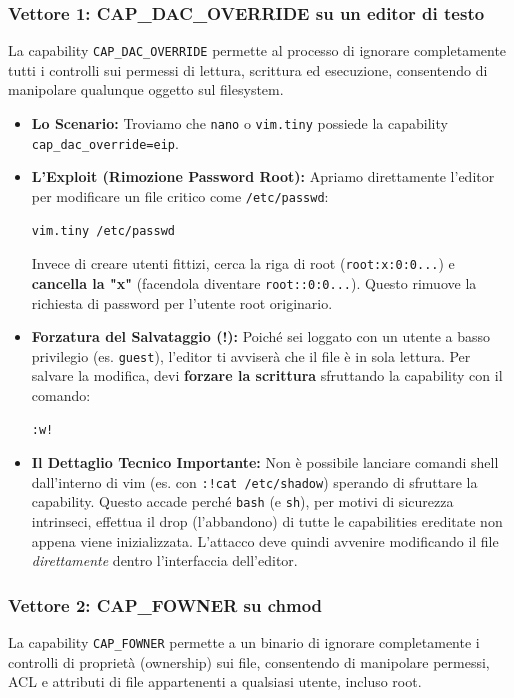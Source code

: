 \documentclass[12pt,a4paper]{report}
\begin{document}
	\subsubsection{Vettore 1: CAP\_DAC\_OVERRIDE su un editor di testo}
	La capability \texttt{CAP\_DAC\_OVERRIDE} permette al processo di ignorare completamente tutti i controlli sui permessi di lettura, scrittura ed esecuzione, consentendo di manipolare qualunque oggetto sul filesystem.
	\begin{itemize}
		\item \textbf{Lo Scenario:} Troviamo che \texttt{nano} o \texttt{vim.tiny} possiede la capability \texttt{cap\_dac\_override=eip}.
		\item \textbf{L'Exploit (Rimozione Password Root):} Apriamo direttamente l'editor per modificare un file critico come \texttt{/etc/passwd}:
		\begin{lstlisting}[language=bash]
			vim.tiny /etc/passwd
		\end{lstlisting}
		Invece di creare utenti fittizi, cerca la riga di root (\texttt{root:x:0:0...}) e \textbf{cancella la "x"} (facendola diventare \texttt{root::0:0...}). Questo rimuove la richiesta di password per l'utente root originario.
		\item \textbf{Forzatura del Salvataggio (!):} Poiché sei loggato con un utente a basso privilegio (es. \texttt{guest}), l'editor ti avviserà che il file è in sola lettura. Per salvare la modifica, devi \textbf{forzare la scrittura} sfruttando la capability con il comando:
		\begin{lstlisting}[language=bash]
			:w!
		\end{lstlisting}
		\item \textbf{Il Dettaglio Tecnico Importante:} Non è possibile lanciare comandi shell dall'interno di vim (es. con \texttt{:!cat /etc/shadow}) sperando di sfruttare la capability. Questo accade perché \texttt{bash} (e \texttt{sh}), per motivi di sicurezza intrinseci, effettua il drop (l'abbandono) di tutte le capabilities ereditate non appena viene inizializzata. L'attacco deve quindi avvenire modificando il file \textit{direttamente} dentro l'interfaccia dell'editor.
	\end{itemize}
	
	\subsubsection{Vettore 2: CAP\_FOWNER su chmod}
	La capability \texttt{CAP\_FOWNER} permette a un binario di ignorare completamente i controlli di proprietà (ownership) sui file, consentendo di manipolare permessi, ACL e attributi di file appartenenti a qualsiasi utente, incluso root.
	
\end{document}
